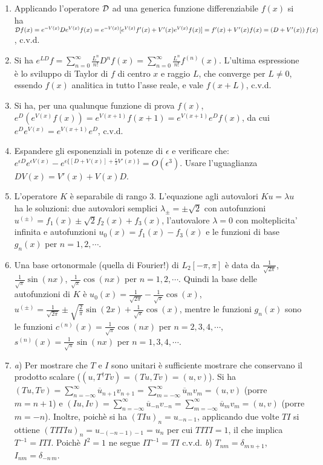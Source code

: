 \documentclass[a4paper,10pt]{article}
\begin{document}
\begin{enumerate}
\item Applicando l'operatore ${\cal D}$ ad una generica funzione differenziabile $f(x)$ si ha ${\cal D}f(x) =e^{-V(x)} D e^{V(x)} f(x)= e^{-V(x)}[ e^{V(x)} f'(x) + V'(x) e^{V(x)} f(x) ] = f'(x)+V'(x) f(x)= (D+V'(x))\,f(x)$, c.v.d.
\item Si ha 
$e^{LD} f = \sum_{n=0}^\infty \frac{L^n}{n!} D^n f(x) =
\sum_{n=0}^\infty \frac{L^n}{n!} f^{(n)}(x)$.
L'ultima espressione \`e lo sviluppo di Taylor di $f$ di centro $x$ e raggio
$L$, che converge per  $L\neq 0$,  essendo $f(x)$ analitica in tutto l'asse reale, e vale $f(x+L)$,
c.v.d.
\item Si ha, per una qualunque
funzione di prova $f(x)$, $e^D (e^{V(x)} f(x)) = 
e^{V(x+1)}f(x+1) = e^{V(x+1)} e^D f(x)$, da cui 
$e^D e^{V(x)} = e^{V(x+1)} e^D$, c.v.d.
\item Espandere gli esponenziali in potenze di $\epsilon$ e verificare che: 
$e^{\epsilon D} e^{\epsilon V(x)} - e^{\epsilon\{[D+V(x)] + \frac{\epsilon}{2} V'(x)\}} = 
O(\epsilon^3)$. Usare l'uguaglianza $DV(x) = V'(x) + V(x)D$. 
\item L'operatore $K$ \`e separabile di rango 3. L'equazione agli autovalori $Ku=\lambda u$ ha le soluzioni: due autovalori semplici $\lambda_{\pm}=\pm \sqrt {2}$ con autofunzioni $u^{(\pm)}= f_1(x)\pm \sqrt {2} f_2(x)+f_3(x)$, l'autovalore $\lambda =0$ con molteplicita' infinita e autofunzioni $u_0(x)=f_1(x)-f_3(x)$ e le funzioni di base $g_n(x)$ per 
$n=1, 2, \cdots$. 
\item Una base ortonormale (quella di Fourier!) di $L_2[-\pi,\pi]$ \`e data da
$\frac{1}{\sqrt{2\pi}}$, $ \frac{1}{\sqrt{\pi}} \sin(nx)$,
$ \frac{1}{\sqrt{\pi}} \cos(nx)$ per $n=1,2,\cdots$. Quindi la base delle autofunzioni di $K$ \`e $u_0(x)=\frac{1}{\sqrt{2\pi}}-  \frac{1}{\sqrt{\pi}} \cos(x) $, $u^{(\pm)}=\frac{1}{\sqrt{2\pi}}\pm \sqrt{\frac{2}{\pi}} \sin(2x) +  \frac{1}{\sqrt{\pi}} \cos(x) $, mentre le funzioni $g_n(x)$ sono le funzioni $c^{(n)}(x)=\frac{1}{\sqrt{\pi}} \cos(nx)$ per $n=2,3,4, \cdots$, $s^{(n)}(x)=\frac{1}{\sqrt{\pi}} \sin(nx)$ per $n=1,3,4, \cdots$.
\item {\it a}) Per mostrare che $T$ e $I$ sono unitari \`e sufficiente mostrare che
conservano il prodotto scalare ($(u,T^\dag T v)=(Tu,Tv)= (u,v)$).
Si ha $(Tu,Tv) = \sum_{n=-\infty}^\infty \overline{u}_{n+1} v_{n+1}=
 \sum_{m=-\infty}^\infty \overline{u}_m v_m=(u,v)$ (porre $m=n+1$) e 
 $(Iu,Iv) = \sum_{n=-\infty}^\infty \overline{u}_{-n} v_{-n}=
 \sum_{m=-\infty}^\infty \overline{u}_m v_m=(u,v)$ (porre $m=-n$).
Inoltre, poich\`e si ha $(TIu)_n = u_{-n-1}$, applicando due volte $TI$ si ottiene  $(TITIu)_n=u_{-(-n-1)-1}=u_n$ per cui 
$TITI = 1$, il che implica $T^{-1}=ITI$. Poich\`e $I^2=1$ ne segue $IT^{-1}=TI$  c.v.d.
{\it b}) $T_{nm} = \delta_{m\,n+1}$, $I_{nm}=\delta_{-n\,m}$. 
\end{enumerate}
\end{document}

